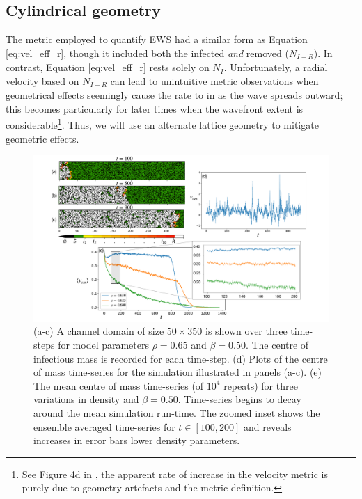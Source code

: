 \subsection{Cylindrical geometry}

The metric \cite{OROZCOFUENTES201912} employed to quantify EWS had a similar form as Equation \ref{eq:vel_eff_r}, 
though it included both the infected \textit{and} removed ($N_{I+R}$). In contrast, Equation \ref{eq:vel_eff_r} rests solely on $N_I$. 
Unfortunately, a radial velocity based on $N_{I+R}$ can lead to unintuitive metric observations when geometrical effects seemingly cause the rate to in as the wave spreads outward; 
this becomes particularly for later times when the wavefront extent is considerable\footnote{
See Figure 4d in \cite{OROZCOFUENTES201912}, the apparent rate of increase in the velocity metric is purely due to geometry artefacts and the metric definition.}.
Thus, we will use an alternate lattice geometry to mitigate geometric effects.

\begin{figure}
    \centering
    \includegraphics[scale=0.30]{chapter4/figures/figure1-channel-domain.pdf}
    \caption{
    (a-c) A channel domain of size $50\times350$ is shown over three time-steps for model parameters $\rho=0.65$ and $\beta=0.50$. 
    The centre of infectious mass is recorded for each time-step. 
    (d) Plots of the centre of mass time-series for the simulation illustrated in panels (a-c). 
    (e) The mean centre of mass time-series (of $10^4$ repeats) for three variations in density and $\beta=0.50$. 
    Time-series begins to decay around the mean simulation run-time.  
    The zoomed inset shows the ensemble averaged time-series for $t\in[100, 200]$ and reveals increases in error bars lower density parameters.
    }
    \label{fig:ews-primer}
\end{figure}

